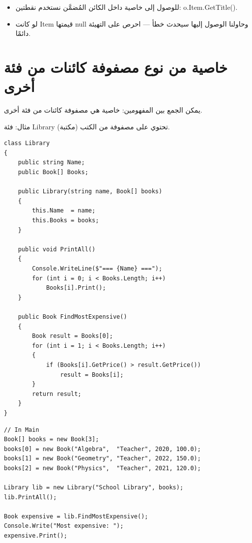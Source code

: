 \documentclass[14pt]{extarticle}
\begin{document}
\begin{itemize}[itemsep=1pt]
    \item للوصول إلى خاصية داخل الكائن المُضمَّن نستخدم نقطتين: \textenglish{o.Item.GetTitle()}.
    \item لو كانت \textenglish{Item} قيمتها \textenglish{null} وحاولنا الوصول إليها سيحدث خطأ — احرص على التهيئة دائمًا.
\end{itemize}

\clearpage
\section{خاصية من نوع مصفوفة كائنات من فئة أخرى}

يمكن الجمع بين المفهومين: خاصية هي مصفوفة كائنات من فئة أخرى.

\begin{boxNote}
مثال: فئة \textenglish{Library} (مكتبة) تحتوي على مصفوفة من الكتب.
\end{boxNote}

{\small
\begin{boxExample}
\begin{english}
\begin{verbatim}
class Library
{
    public string Name;
    public Book[] Books;

    public Library(string name, Book[] books)
    {
        this.Name  = name;
        this.Books = books;
    }

    public void PrintAll()
    {
        Console.WriteLine($"=== {Name} ===");
        for (int i = 0; i < Books.Length; i++)
            Books[i].Print();
    }

    public Book FindMostExpensive()
    {
        Book result = Books[0];
        for (int i = 1; i < Books.Length; i++)
        {
            if (Books[i].GetPrice() > result.GetPrice())
                result = Books[i];
        }
        return result;
    }
}
\end{verbatim}
\end{english}
\end{boxExample}

\begin{boxExample}
\begin{english}
\begin{verbatim}
// In Main
Book[] books = new Book[3];
books[0] = new Book("Algebra",  "Teacher", 2020, 100.0);
books[1] = new Book("Geometry", "Teacher", 2022, 150.0);
books[2] = new Book("Physics",  "Teacher", 2021, 120.0);

Library lib = new Library("School Library", books);
lib.PrintAll();

Book expensive = lib.FindMostExpensive();
Console.Write("Most expensive: ");
expensive.Print();
\end{verbatim}
\end{english}
\end{boxExample}
}
\end{document}
